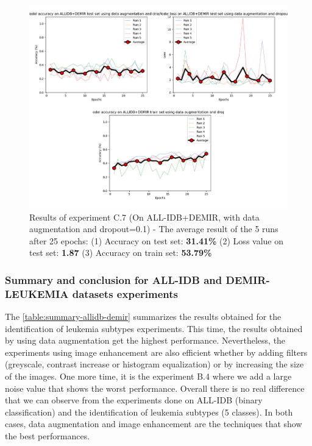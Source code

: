 \documentclass[11pt, openany]{report}
\theoremstyle{plain}
\theoremstyle{definition}
\theoremstyle{remark}
\begin{document}
\begin{figure}[H]
  \centering
  \includegraphics[scale=0.45]{Code/ch6-LeukemiaSubtypes/figures_result/LEUK-SUBTYPES/leukSub-data_aug_dropout.PNG}
  \caption{Results of experiment C.7 (On ALL-IDB+DEMIR, with data augmentation and dropout=0.1) - The average result of the 5 runs after 25 epochs: (1) Accuracy on test set: \textbf{31.41\%} (2) Loss value on test set: \textbf{1.87} (3) Accuracy on train set: \textbf{53.79\%}}
  \label{fig:results-C7}
\end{figure}

\subsubsection{Summary and conclusion for ALL-IDB and DEMIR-LEUKEMIA datasets experiments}

The \autoref{table:summary-allidb-demir} summarizes the results obtained for the identification of leukemia subtypes experiments. This time, the results obtained by using data augmentation get the highest performance. Nevertheless, the experiments using image enhancement are also efficient whether by adding filters (greyscale, contrast increase or histogram equalization) or by increasing the size of the images. One more time, it is the experiment B.4 where we add a large noise value that shows the worst performance. Overall there is no real difference that we can observe from the experiments done on ALL-IDB (binary classification) and the identification of leukemia subtypes (5 classes). In both cases, data augmentation and image enhancement are the techniques that show the best performances.    
\end{document}
